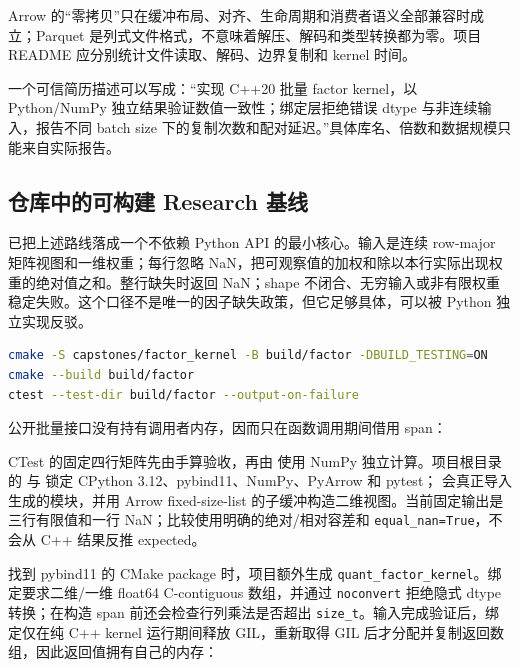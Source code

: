 Arrow 的“零拷贝”只在缓冲布局、对齐、生命周期和消费者语义全部兼容时成立；Parquet 是列式文件格式，不意味着解压、解码和类型转换都为零。项目 README 应分别统计文件读取、解码、边界复制和 kernel 时间。

一个可信简历描述可以写成：“实现 C++20 批量 factor kernel，以 Python/NumPy 独立结果验证数值一致性；绑定层拒绝错误 dtype 与非连续输入，报告不同 batch size 下的复制次数和配对延迟。”具体库名、倍数和数据规模只能来自实际报告。

\subsection{仓库中的可构建 Research 基线}

 已把上述路线落成一个不依赖 Python API 的最小核心。输入是连续 row-major 矩阵视图和一维权重；每行忽略 NaN，把可观察值的加权和除以本行实际出现权重的绝对值之和。整行缺失时返回 NaN；shape 不闭合、无穷输入或非有限权重稳定失败。这个口径不是唯一的因子缺失政策，但它足够具体，可以被 Python 独立实现反驳。

\begin{lstlisting}[language=bash,numbers=none]
cmake -S capstones/factor_kernel -B build/factor -DBUILD_TESTING=ON
cmake --build build/factor
ctest --test-dir build/factor --output-on-failure
\end{lstlisting}

公开批量接口没有持有调用者内存，因而只在函数调用期间借用 span：





CTest 的固定四行矩阵先由手算验收，再由  使用 NumPy 独立计算。项目根目录的  与  锁定 CPython 3.12、pybind11、NumPy、PyArrow 和 pytest； 会真正导入生成的模块，并用 Arrow fixed-size-list 的子缓冲构造二维视图。当前固定输出是三行有限值和一行 NaN；比较使用明确的绝对/相对容差和 \texttt{equal\_nan=True}，不会从 C++ 结果反推 expected。

找到 pybind11 的 CMake package 时，项目额外生成 \texttt{quant\_factor\_kernel}。绑定要求二维/一维 float64 C-contiguous 数组，并通过 \texttt{noconvert} 拒绝隐式 dtype 转换；在构造 span 前还会检查行列乘法是否超出 \texttt{size\_t}。输入完成验证后，绑定仅在纯 C++ kernel 运行期间释放 GIL，重新取得 GIL 后才分配并复制返回数组，因此返回值拥有自己的内存：

